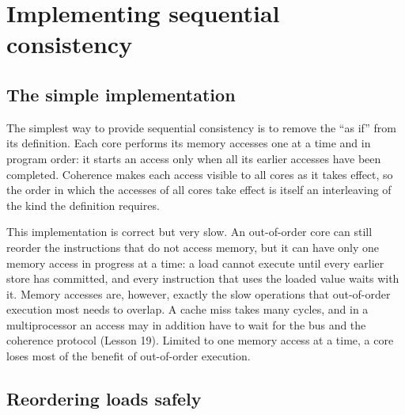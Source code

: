 \documentclass[../main.tex]{subfiles}
\begin{document}
\section{Implementing sequential consistency}
\label{sec:l21-implementing}

\subsection{The simple implementation}

The simplest way to provide sequential consistency is to remove the
\enquote{as if} from its definition.  Each core performs its memory accesses one at a time and in program
order: it starts an access only when all its earlier accesses have been
completed.  Coherence makes each access visible to all cores as it takes
effect, so the order in which the accesses of all cores take effect is itself
an interleaving of the kind the definition requires.

This implementation is correct but very slow.  An out-of-order core can still
reorder the instructions that do not access memory, but it can have only one
memory access in progress at a time: a load cannot execute until
every earlier store has committed, and every instruction that uses the loaded
value waits with it.  Memory accesses are, however, exactly the slow
operations that out-of-order execution most needs to overlap.  A cache miss
takes many cycles, and in a multiprocessor an access may in addition have to
wait for the bus and the coherence protocol (Lesson 19).  Limited to one
memory access at a time, a core loses most of the benefit of out-of-order
execution.

\subsection{Reordering loads safely}
\end{document}
